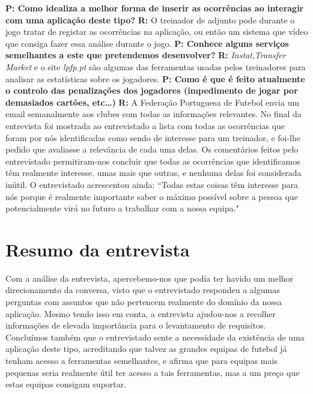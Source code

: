 \newline\textbf{P: Como idealiza a melhor forma de inserir as ocorrências ao interagir com uma aplicação deste tipo?}
\vspace{2mm}
\newline\textbf{R:} O treinador de adjunto pode durante o jogo tratar de registar as ocorrências na aplicação, ou então um sistema que vídeo que consiga fazer essa análise durante o jogo.
\vspace{2mm}
\newline\textbf{P: Conhece alguns serviços semelhantes a este que pretendemos desenvolver?}
\vspace{2mm}
\newline\textbf{R:} \emph{Instat},\emph{Transfer Market} e o site \emph{lpfp.pt} são algumas das ferramentas usadas pelos treinadores para analisar as estatísticas sobre os jogadores.
\vspace{2mm}
\newline\textbf{P: Como é que é feito atualmente o controlo das penalizações dos jogadores (impedimento de jogar por demasiados cartões, etc…)}
\vspace{2mm}
\newline\textbf{R:} A Federação Portuguesa de Futebol envia um email semanalmente aos clubes com todas as informações relevantes.
\vspace{3mm}
\newline
No final da entrevista foi mostrada ao entrevistado a lista com todas as ocorrências que foram por nós identificadas como sendo de interesse para um treinador, e foi-lhe pedido que avaliasse a relevância de cada uma delas. Os comentários feitos pelo entrevistado permitiram-nos concluir que todas as ocorrências que identificamos têm realmente interesse, umas mais que outras, e nenhuma delas foi considerada inútil. O entrevistado acrescentou ainda: “Todas estas coisas têm interesse para nós porque é realmente importante saber o máximo possível sobre a pessoa que potencialmente virá no futuro a trabalhar com a nossa equipa."
\vspace{2mm}

\section{Resumo da entrevista}
Com a análise da entrevista, apercebemo-nos que podia ter havido um melhor direcionamento da conversa, visto que o entrevistado respondeu a algumas perguntas com assuntos que não pertencem realmente do domínio da nossa aplicação. Mesmo tendo isso em conta, a entrevista ajudou-nos a recolher informações de elevada importância para o levantamento de requisitos.
Concluímos também que o entrevistado sente a necessidade da existência de uma aplicação deste tipo, acreditando que talvez as grandes equipas de futebol já tenham acesso a ferramentas semelhantes, e afirma que para equipas mais pequenas seria realmente útil ter acesso a tais ferramentas, mas a um preço que estas equipas consigam suportar.
